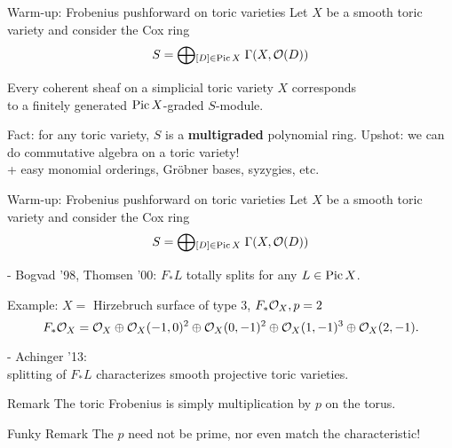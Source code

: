 \documentclass[beamer]{paper}
\def\OO{\mathcal{O}}
\begin{document}
\begin{frame}[t]{Warm-up: Frobenius pushforward on toric varieties}
  Let $X$ be a smooth toric variety and consider the Cox ring
  \[ S = \bigoplus\!{}_{[D]\in\Pic{X}} \; \Gamma(X, \OO(D)) \]

  \begin{theorem}
    Every coherent sheaf on a simplicial toric variety $X$ corresponds \\
    to a finitely generated $\operatorname{Pic}X$-graded $S$-module.
  \end{theorem}

  \vfill
  Fact: for any toric variety, $S$ is a \textbf{multigraded} polynomial ring.
  Upshot: we can do commutative algebra on a toric variety! \\
  \hfill + easy monomial orderings, Gr\"obner bases, syzygies, etc.
\end{frame}


\begin{frame}[t]{Warm-up: Frobenius pushforward on toric varieties}
  Let $X$ be a smooth toric variety and consider the Cox ring
  \[ S = \bigoplus\!{}_{[D]\in\Pic{X}} \; \Gamma(X, \OO(D)) \]

  - Bogvad '98, Thomsen '00: $F_*L$ totally splits for any $L\in\operatorname{Pic}X$.
  \begin{block}{Example: $X = $ Hirzebruch surface of type 3, $F_*\mathcal{O}_X, p = 2$}
    \vspace*{-0.2in}
    \[ F_*\mathcal{O}_X = \mathcal{O}_X \oplus \mathcal{O}_X(-1,0)^2 \oplus \mathcal{O}_X(0,-1)^2 \oplus \mathcal{O}_X(1,-1)^3 \oplus \mathcal{O}_X(2,-1). \]
  \end{block}

  - Achinger '13: \\ \hfill splitting of $F_*L$ characterizes smooth projective toric varieties.

  \vfill
  \begin{block}{Remark}
    The toric Frobenius is simply multiplication by $p$ on the torus.
  \end{block}
  \begin{alertblock}{Funky Remark}
    The $p$ need not be prime, nor even match the characteristic!
  \end{alertblock}
\end{frame}
\end{document}
